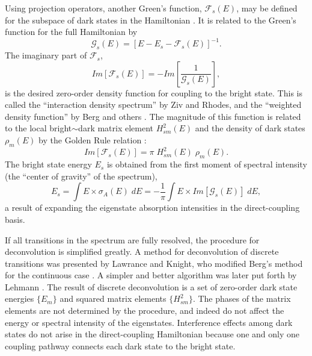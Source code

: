 Using projection operators, another Green's function,
$\mathcal{F}_s(E)$, may be defined for the subspace of dark states in
the Hamiltonian \cite{ziv76, cable80}.  It is related to the Green's
function for the full Hamiltonian by
\begin{equation}
  \label{eq:green-subspace}
  \mathcal{G}_s(E) = [E - E_s - \mathcal{F}_s(E)]^{-1}.
\end{equation}
The imaginary part of $\mathcal{F}_s$,
\begin{equation}
  \label{eq:idf}
  Im[\mathcal{F}_s(E)] = - Im \left [
    \frac{1}{\mathcal{G}_s(E)}
  \right ], 
\end{equation}
is the desired zero-order density function for coupling to the bright
state.  This is called the ``interaction density spectrum'' by Ziv and
Rhodes, and the ``weighted density function'' by Berg and others
\cite{ziv76, berg76}.  The magnitude of this function is related to
the local bright$\sim$dark matrix element $H_{sm}^2(E)$ and the
density of dark states $\rho_m(E)$ by the Golden Rule relation \cite{berg76}:
\begin{equation}
  Im[\mathcal{F}_s(E)] = \pi \; H_{sm}^2(E) \; \rho_m(E).
\end{equation}
The bright state energy $E_s$ is obtained from the first moment of
spectral intensity (the ``center of gravity'' of the spectrum),
\begin{equation}
  \label{eq:bse-continuous}
  E_s = \int E \times \sigma_A (E) \; dE
  = - \frac{1}{\pi} \int E \times Im[\mathcal{G}_s(E)] \; dE,
\end{equation}
a result of expanding the eigenstate absorption intensities in the
direct-coupling basis.


If all transitions in the spectrum are fully resolved, the procedure
for deconvolution is simplified greatly.  A method for deconvolution
of discrete transitions was presented by Lawrance and Knight, who
modified Berg's method for the continuous case \cite{lawrance85,
  berg76}.  A simpler and better algorithm was later put forth by
Lehmann \cite{lehmann91}.  The result of discrete deconvolution is a
set of zero-order dark state energies $\lbrace E_m \rbrace$ and
squared matrix elements $\lbrace H_{sm}^2 \rbrace$.  The phases of the
matrix elements are not determined by the procedure, and indeed do not
affect the energy or spectral intensity of the eigenstates.
Interference effects among dark states do not arise in the
direct-coupling Hamiltonian because one and only one coupling pathway
connects each dark state to the bright state.

